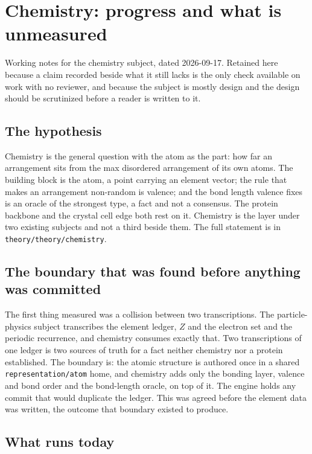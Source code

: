 \chapter{Chemistry: progress and what is unmeasured}

Working notes for the chemistry subject, dated 2026-09-17. Retained here because a claim recorded beside
what it still lacks is the only check available on work with no reviewer, and because the subject is
mostly design and the design should be scrutinized before a reader is written to it.

\section*{The hypothesis}

Chemistry is the general question with the atom as the part: how far an arrangement sits from the max
disordered arrangement of its own atoms. The building block is the atom, a point carrying an element
vector; the rule that makes an arrangement non-random is valence; and the bond length valence fixes is
an oracle of the strongest type, a fact and not a consensus. The protein backbone and the crystal
cell edge both rest on it. Chemistry is the layer under two existing subjects and not a third
beside them. The full statement is in \texttt{theory/theory/chemistry}.

\section*{The boundary that was found before anything was committed}

The first thing measured was a collision between two transcriptions. The particle-physics subject transcribes the
element ledger, \(Z\) and the electron set and the periodic recurrence, and chemistry consumes exactly
that. Two transcriptions of one ledger is two sources of truth for a fact neither chemistry nor a
protein established. The boundary is: the atomic structure is authored once in a shared
\texttt{representation/atom} home, and chemistry adds only the bonding layer, valence and bond order
and the bond-length oracle, on top of it. The engine holds any commit that would duplicate the
ledger. This was agreed before the element data was written, the outcome that boundary
existed to produce.

\section*{What runs today}

